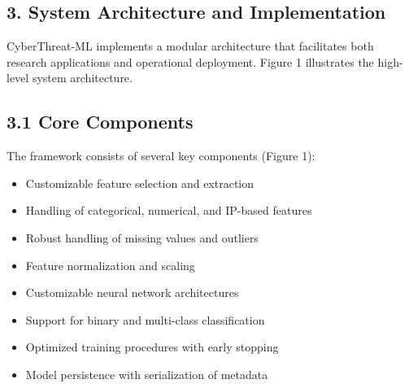 \documentclass[12pt]{article}
\begin{document}
\subsection{3. System Architecture and Implementation}
CyberThreat-ML implements a modular architecture that facilitates both research applications and operational deployment. Figure 1 illustrates the high-level system architecture.

\subsection{3.1 Core Components}
The framework consists of several key components (Figure 1):

\begin{itemize}
\item Customizable feature selection and extraction
\end{itemize}

\begin{itemize}
\item Handling of categorical, numerical, and IP-based features
\end{itemize}

\begin{itemize}
\item Robust handling of missing values and outliers
\end{itemize}

\begin{itemize}
\item Feature normalization and scaling
\end{itemize}

\begin{itemize}
\item Customizable neural network architectures
\end{itemize}

\begin{itemize}
\item Support for binary and multi-class classification
\end{itemize}

\begin{itemize}
\item Optimized training procedures with early stopping
\end{itemize}

\begin{itemize}
\item Model persistence with serialization of metadata
\end{itemize}
\end{document}
